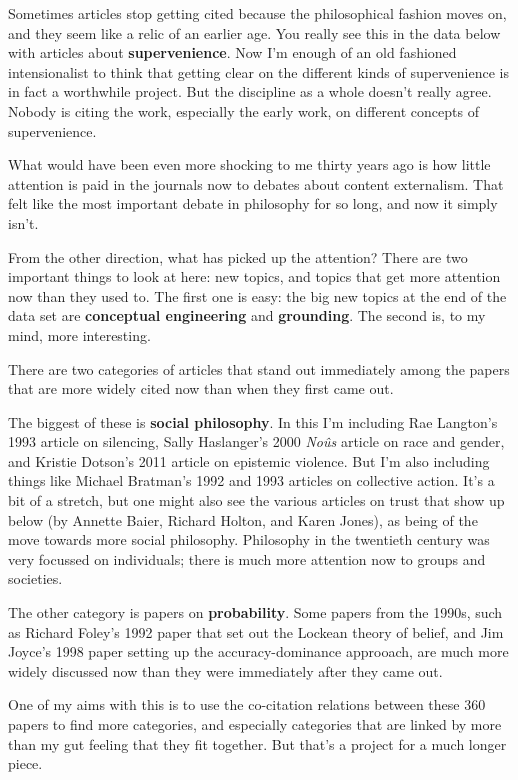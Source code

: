\documentclass[
  10pt,
  letterpaper,
  DIV=11,
  numbers=noendperiod,
  twoside]{scrartcl}
\begin{document}
Sometimes articles stop getting cited because the philosophical fashion
moves on, and they seem like a relic of an earlier age. You really see
this in the data below with articles about \textbf{supervenience}. Now
I'm enough of an old fashioned intensionalist to think that getting
clear on the different kinds of supervenience is in fact a worthwhile
project. But the discipline as a whole doesn't really agree. Nobody is
citing the work, especially the early work, on different concepts of
supervenience.

What would have been even more shocking to me thirty years ago is how
little attention is paid in the journals now to debates about content
externalism. That felt like the most important debate in philosophy for
so long, and now it simply isn't.

From the other direction, what has picked up the attention? There are
two important things to look at here: new topics, and topics that get
more attention now than they used to. The first one is easy: the big new
topics at the end of the data set are \textbf{conceptual engineering}
and \textbf{grounding}. The second is, to my mind, more interesting.

There are two categories of articles that stand out immediately among
the papers that are more widely cited now than when they first came out.

The biggest of these is \textbf{social philosophy}. In this I'm
including Rae Langton's 1993 article on silencing, Sally Haslanger's
2000 \emph{Noûs} article on race and gender, and Kristie Dotson's 2011
article on epistemic violence. But I'm also including things like
Michael Bratman's 1992 and 1993 articles on collective action. It's a
bit of a stretch, but one might also see the various articles on trust
that show up below (by Annette Baier, Richard Holton, and Karen Jones),
as being of the move towards more social philosophy. Philosophy in the
twentieth century was very focussed on individuals; there is much more
attention now to groups and societies.

The other category is papers on \textbf{probability}. Some papers from
the 1990s, such as Richard Foley's 1992 paper that set out the Lockean
theory of belief, and Jim Joyce's 1998 paper setting up the
accuracy-dominance approoach, are much more widely discussed now than
they were immediately after they came out.

One of my aims with this is to use the co-citation relations between
these 360 papers to find more categories, and especially categories that
are linked by more than my gut feeling that they fit together. But
that's a project for a much longer piece.
\end{document}
